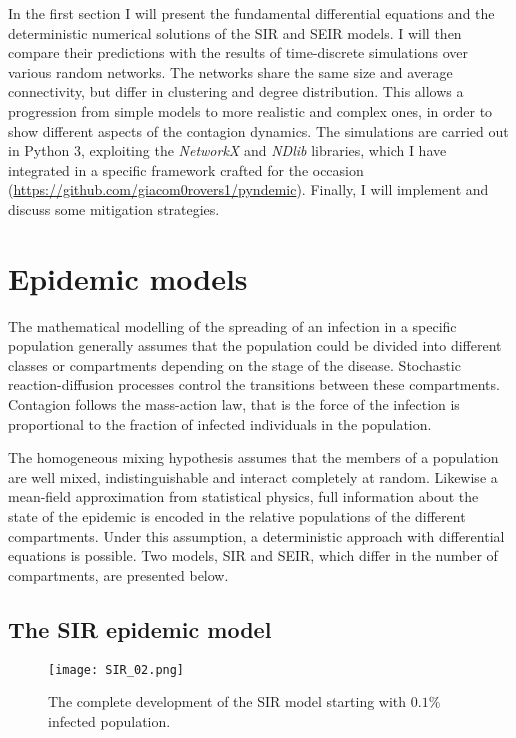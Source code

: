 \documentclass[DIV=12, BCOR=0pt]{scrartcl}  %
\begin{document}
 	In the first section I will present the fundamental differential equations and the deterministic numerical solutions of the SIR and SEIR models. I will then compare their predictions with the results of time-discrete simulations over various random networks. The networks share the same size and average connectivity, but differ in clustering and degree distribution. This allows a progression from simple models to more realistic and complex ones, in order to show different aspects of the contagion dynamics. The simulations are carried out in Python 3, exploiting the \textit{NetworkX} and \textit{NDlib} libraries, which I have integrated in a specific framework crafted for the occasion (\href{https://github.com/giacom0rovers1/pyndemic}{https://github.com/giacom0rovers1/pyndemic}). %
 	Finally, I will implement and discuss some mitigation strategies.
  
  \section{Epidemic models}
  \label{sec:theory}
	The mathematical modelling of the spreading of an infection in a specific population generally assumes that the population could be divided into different classes or compartments depending on the stage of the disease.
	Stochastic reaction-diffusion processes control the transitions between these compartments. 
	Contagion follows the mass-action law, that is the force of the infection is proportional to the fraction of infected individuals in the population.
	
  The homogeneous mixing hypothesis assumes that the members of a population are well mixed, indistinguishable and interact completely at random.
  Likewise a mean-field approximation from statistical physics, full information about the state of the epidemic is encoded in the relative populations of the different compartments. Under this assumption, a deterministic approach with differential equations is possible. Two models, SIR and SEIR, which differ in the number of compartments, are presented below.
   
  \subsection{The SIR epidemic model}
  
  \begin{figure}[h]
  	\centering
  	\texttt{[image: SIR\_02.png]}
  	\caption{The complete development of the SIR model starting with $0.1\%$ infected population.}
  	\label{fig:SIRtot}
  \end{figure}
\end{document}
